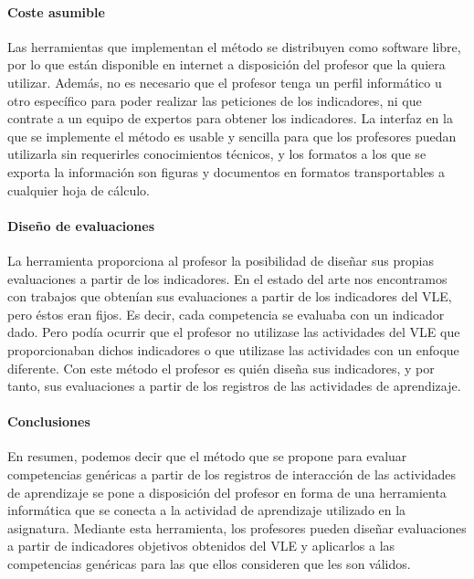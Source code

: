 \paragraph*{Coste asumible}

Las herramientas que implementan el método se distribuyen como software libre, por lo que están disponible en internet a disposición del profesor que la quiera utilizar. Además, no es necesario que el profesor tenga un perfil informático u otro específico para poder realizar las peticiones de los indicadores, ni que contrate a un equipo de expertos para obtener los indicadores. La interfaz en la que se implemente el método es usable y sencilla para que los profesores puedan utilizarla sin requerirles conocimientos técnicos, y los formatos a los que se exporta la información son figuras y documentos en formatos transportables a cualquier hoja de cálculo.

\paragraph*{Diseño de evaluaciones}

La herramienta proporciona al profesor la posibilidad de diseñar sus propias evaluaciones a partir de los indicadores. En el estado del arte nos encontramos con trabajos que obtenían sus evaluaciones a partir de los indicadores del VLE, pero éstos eran fijos. Es decir, cada competencia se evaluaba con un indicador dado. Pero podía ocurrir que el profesor no utilizase las actividades del VLE que proporcionaban dichos indicadores o que utilizase las actividades con un enfoque diferente. Con este método el profesor es quién diseña sus indicadores, y por tanto, sus evaluaciones a partir de los registros de las actividades de aprendizaje.

\paragraph*{Conclusiones}

En resumen, podemos decir que el método que se propone para evaluar competencias genéricas a partir de los registros de interacción de las actividades de aprendizaje se pone a disposición del profesor en forma de una herramienta informática que se conecta a la actividad de aprendizaje utilizado en la asignatura. Mediante esta herramienta, los profesores pueden diseñar evaluaciones a partir de indicadores objetivos obtenidos del VLE y aplicarlos a las competencias genéricas para las que ellos consideren que les son válidos.


